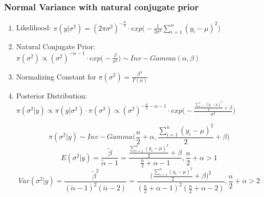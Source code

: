 \documentclass{beamer}
\begin{document}


\begin{frame}
\frametitle{Normal Variance with natural conjugate prior}

\begin{enumerate}
\item Likelihood: $\pi(y|\sigma^2) = (2\pi \sigma^2)^{-\frac{n}{2}} \cdot exp\Big(-\frac{1}{2\sigma^2}\sum_{i=1}^n(y_i-\mu)^2\Big)$

\item Natural Conjugate Prior: $\pi(\sigma^2) \propto (\sigma^2)^{-\alpha -1} \cdot exp\Big(-\frac{\beta}{\sigma^2}\Big) \sim Inv-Gamma(\alpha, \beta)$

\item Normalizing Constant for $\pi(\sigma^2) = \frac{\beta^\alpha}{\Gamma(\alpha)}$

\item Posterior Distribution: $\pi(\sigma^2|y) \propto \pi(y|\sigma^2) \cdot \pi(\sigma^2) \propto (\sigma^2)^{-\frac{n}{2} - \alpha -1} \cdot exp\Big(-\frac{\frac{\sum_{i=1}^n (y_i - \mu)^2}{2}+ \beta}{\sigma^2}\Big)$

$$\pi(\sigma^2|y) \sim Inv-Gamma\Big(\frac{n}{2} + \alpha, \frac{\sum_{i=1}^n (y_i - \mu)^2}{2} + \beta\Big)$$
$$E(\sigma^2|y) = \frac{\tilde \beta}{\tilde \alpha -1} = \frac{\frac{\sum_{i=1}^n (y_i - \mu)^2}{2}+\beta}{\frac{n}{2}+\alpha - 1}, \frac{n}{2} + \alpha >1$$
$$Var(\sigma^2|y) = \frac{\tilde \beta^2}{(\tilde\alpha -1)^2 (\tilde \alpha -2)} = \frac{\Big(\frac{\sum_{i=1}^n (y_i - \mu)^2}{2}+\beta\Big)^2}{(\frac{n}{2}+\alpha - 1)^2 (\frac{n}{2}+\alpha - 2)}, \frac{n}{2}+\alpha>2$$


\end{enumerate}

\end{frame}

\end{document}
